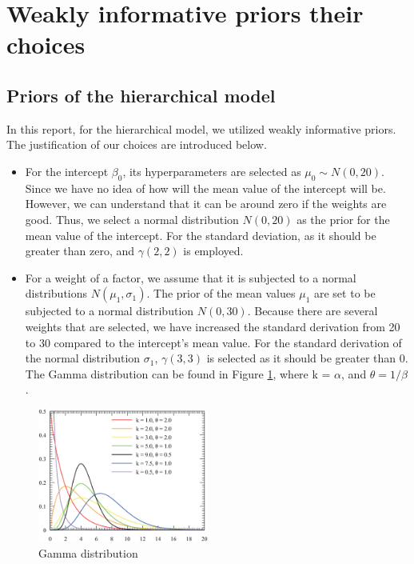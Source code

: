 \documentclass[a4paper]{artikel3}
\begin{document}
\section{Weakly informative priors their choices} 
\subsection{Priors of the hierarchical model}
In this report, for the hierarchical model, we utilized weakly informative priors. The justification of our choices are introduced below. 
\begin{itemize}
    \item For the intercept $\beta_0$, its hyperparameters are selected as  $\mu_0 \sim N(0,20)$. Since we have no idea of how will the mean value of the intercept will be. However, we can understand that it can be around zero if the weights are good. Thus, we select a normal distribution $N(0,20)$ as the prior for the mean value of the intercept. For the standard deviation, as it should be greater than zero, and  $\gamma(2,2)$ is employed. 
    \item For a weight of a factor, we assume that it is subjected to a normal distributions $N(\mu_1,\sigma_1)$. The prior of the mean values $\mu_1$ are set to be subjected to a normal distribution $N(0,30)$. Because there are several weights that are selected, we have increased the standard derivation from 20 to 30 compared to the intercept's mean value. For the standard derivation of the normal distribution $\sigma_1$, $\gamma(3,3)$ is selected as it should be greater than 0. The Gamma distribution can be found in Figure \ref{fig: gamma distribution}, where k = $\alpha$, and $\theta=1/\beta$ \cite{Gamma}. 
\end{itemize}

\begin{figure}[!ht]
	\centering
	\includegraphics[width=0.5\textwidth]{./figures/Gamma_distribution.eps}
	\caption{Gamma distribution}
	\label{fig: gamma distribution}
\end{figure}
\end{document}
